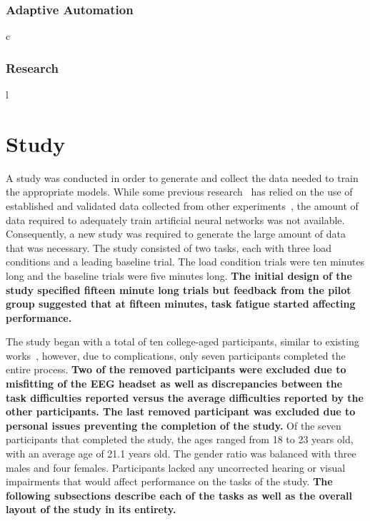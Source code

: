 \documentclass[11pt]{article}
\begin{document}
		\subsubsection{Adaptive Automation}
c		
		\subsubsection{Research}
l
\section{Study}
A study was conducted in order to generate and collect the data needed to train the appropriate models. While some previous research~\cite{cross research I believe} has relied on the use of established and validated data collected from other experiments~\cite{main Wilson paper}, the amount of data required to adequately train artificial neural networks was not available. Consequently, a new study was required to generate the large amount of data that was necessary. The study consisted of two tasks, each with three load conditions and a leading baseline trial. The load condition trials were ten minutes long and the baseline trials were five minutes long. 
{\bf The initial design of the study specified fifteen minute long trials but feedback from the pilot group suggested that at fifteen minutes, task fatigue started affecting performance. } %


The study began with a total of ten college-aged participants, similar to existing works~\cite{ ... }, however, due to complications, only seven participants completed the entire process. 
{\bf Two of the removed participants were excluded due to misfitting of the EEG headset as well as discrepancies between the task difficulties reported versus the average difficulties reported by the other participants. The last removed participant was excluded due to personal issues preventing the completion of the study.} %
Of the seven participants that completed the study, the ages ranged from 18 to 23 years old, with an average age of 21.1 years old. The gender ratio was balanced with three males and four females. Participants lacked any uncorrected hearing or visual impairments that would affect performance on the tasks of the study. 
{\bf The following subsections describe each of the tasks as well as the overall layout of the study in its entirety. } %
	
\end{document}
